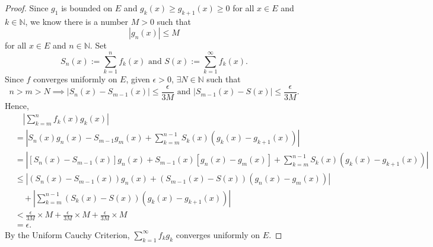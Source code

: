 \begin{Exercise}
\begin{proof}
Since $g_1$ is bounded on $E$ and $g_k(x) \geq g_{k+1}(x) \geq 0$ for all $x\in E$ and $k\in\mathbb{N}$, we know there is a number $M>0$ such that $$\left| g_n(x) \right| \leq M$$ for all $x\in E$ and $n\in\mathbb{N}$.
Set $$S_n(x) := \sum_{k=1}^{n}f_k(x)\mbox{ and } S(x) := \sum_{k=1}^{\infty}f_k(x).$$
Since $f$ converges uniformly on $E$, given $\epsilon>0$, $\exists N\in\mathbb{N}$ such that $$n>m>N \implies \left| S_n(x)-S_{m-1}(x) \right| \leq \frac{\epsilon}{3M}\mbox{ and } \left| S_{m-1}(x)-S(x) \right| \leq \frac{\epsilon}{3M}.$$
Hence, 
\begin{align*}
&\quad \left| \sum_{k=m}^{n} f_k(x) g_k(x) \right| \\
&= \left| S_n(x) g_n(x) - S_{m-1} g_m(x) + \sum_{k=m}^{n-1}S_k(x)\left( g_k(x)-g_{k+1}(x) \right) \right| \\
&= \left| \left[ S_n(x)-S_{m-1}(x) \right] g_n(x) + S_{m-1}(x) \left[ g_n(x)-g_m(x) \right] + \sum_{k=m}^{n-1}S_k(x)\left( g_k(x)-g_{k+1}(x) \right) \right| \\
&\leq \left| \left( S_n(x)-S_{m-1}(x) \right) g_n(x) + \left( S_{m-1}(x)-S(x) \right) \left( g_n(x) - g_m(x) \right) \right| \\
&\quad + \left| \sum_{k=m}^{n-1}\left( S_k(x)-S(x) \right) \left( g_k(x)-g_{k+1}(x) \right) \right| \\
&< \frac{\epsilon}{3M} \times M + \frac{\epsilon}{3M} \times M + \frac{\epsilon}{3M} \times M \\
&= \epsilon.
\end{align*}
By the Uniform Cauchy Criterion, $\sum_{k=1}^{\infty}f_k g_k$ converges uniformly on $E$.
\end{proof}
\end{Exercise}